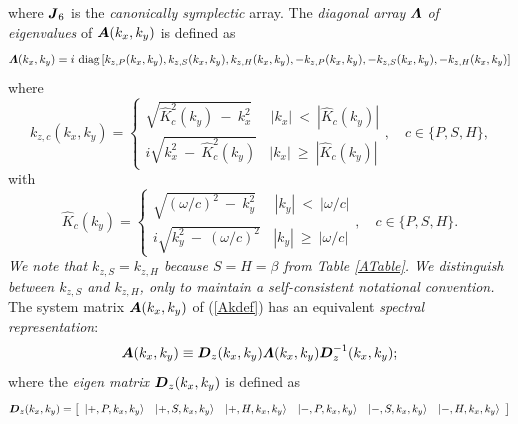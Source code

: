\documentclass[11pt,a4paper]{article}
\newcommand{\bmi}[1]{\mbox{\boldmath$\mit #1$\unboldmath}}
\begin{document}
where ${\bmi  J}_6$ is the {\em canonically symplectic\/} array.
The {\em diagonal array\/} ${\bmi
\Lambda}$ {\em of eigenvalues\/}  of ${\bmi  A}({k}_{x},{k}_{y})$ is defined as
\begin{equation}	\label{eigDef}
{\bmi \Lambda}({k}_{x},{k}_{y}) = i \ \mbox{diag} \left[{k}_{z,P
	}({k}_{x},{k}_{y}),{k}_{z,S }({k}_{x},{k}_{y}),{k}_{z,H }({k}_{x},{k}_{y}),
	-{k}_{z,P }({k}_{x},{k}_{y}),-{k}_{z,S }({k}_{x},{k}_{y}),
	-{k}_{z,H }({k}_{x},{k}_{y}) \right]
\end{equation}
where
\begin{equation}	\label{kzcDef}
	{k}_{z,c}({k}_{x},{k}_{y}) = \left\{
	\begin{array}{c}
	\sqrt {\hat{ K}_{c}^{2}({k}_{y})\ -\ {k}_{x}^{2}}\ \ \ \ \ \ |{k}_{x}|\ <\
	|\hat{K}_{c}({k}_{y})|\\
	i\sqrt {{k}_{x}^{ 2}\ -\ \hat{ K}_{c}^{2}({k}_{y})} \ \ \ \ |{k}_{x}|\ \ge   \
	|\hat{K}_{c}({k}_{y})|
\end{array}
\right. , \quad  c\in\{P,S,H\},
\end{equation}
with
\begin{equation}	\label{Kdef}
	\hat{K}_{c}({k}_{y}) = \left\{
	\begin{array}{c}
	\sqrt {(\omega/{c})^{2}\ -\ {k}_{y}^{2}}\ \ \ \ \ \ |{k}_{y}|\ <\
	|\omega/{c}|\\
	i\sqrt {{k}_{y}^{ 2}\ -\ (\omega/{c})^{2}} \ \ \ \ |{k}_{y}|\ \ge   \ |\omega/{c}|
\end{array} \right. , \quad  c\in\{P,S,H\}.
\end{equation}
{\em We note that ${k}_{z,S }={k}_{z,H }$
because $S=H=\beta$ from Table \ref{ATable}. We distinguish
between ${k}_{z,S }$ and ${k}_{z,H }$,  only to maintain a self-consistent
notational convention.\/}
 The system matrix ${\bmi  A}({k}_{x},{k}_{y})$ of (\ref{Akdef}) has an equivalent {\em
spectral representation\/}:
\begin{equation}	\label{specA}
	{\bmi  A}({k}_{x},{k}_{y}) \equiv {\bmi  D}_{z}({k}_{x},{k}_{y}){\bmi
	\Lambda }({k}_{x},{k}_{y}){\bmi  D}_{z}^{ -1}({k}_{x},{k}_{y});
\end{equation}
where the {\em eigen matrix\/} ${\bmi  D}_{z}({k}_{x},{k}_{y})$ is  defined as
\begin{equation} \label{Ddef}
{\bmi D}_{z}(k_{x},k_{y})=\left[\begin{array}{cccccc}
\left|+,P, k_{x},k_{y}  \right\rangle&\left|+,S, k_{x},k_{y}
\right\rangle&\left|+,H, k_{x},k_{y}  \right\rangle&
\left|-,P, k_{x},k_{y}  \right\rangle&\left|-,S, k_{x},k_{y}
\right\rangle&\left|-,H, k_{x},k_{y}  \right\rangle
\end{array}\right]
\end{equation}
\end{document}

